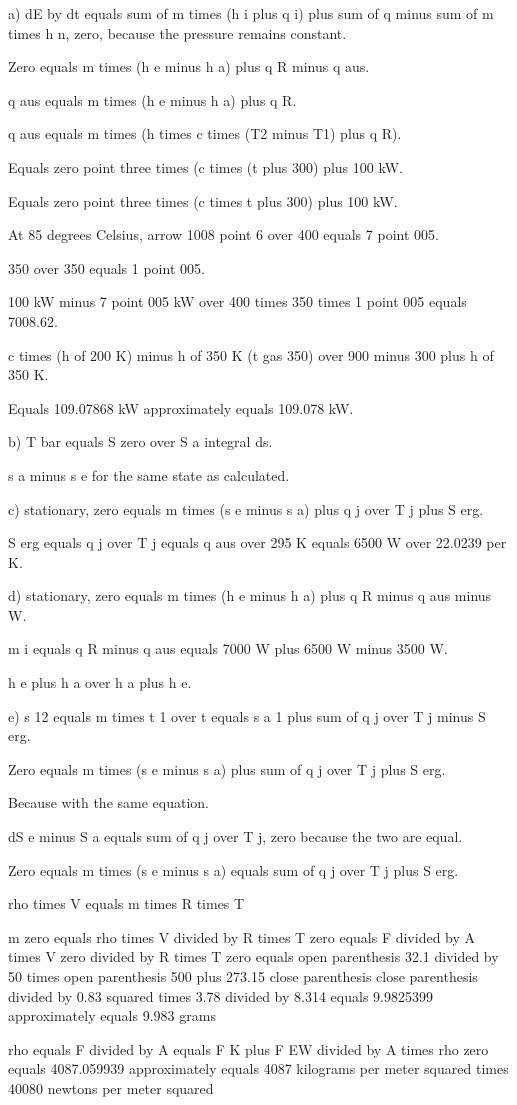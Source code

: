 a) dE by dt equals sum of m times (h i plus q i) plus sum of q minus sum of m times h n, zero, because the pressure remains constant.

Zero equals m times (h e minus h a) plus q R minus q aus.

q aus equals m times (h e minus h a) plus q R.

q aus equals m times (h times c times (T2 minus T1) plus q R).

Equals zero point three times (c times (t plus 300) plus 100 kW.

Equals zero point three times (c times t plus 300) plus 100 kW.

At 85 degrees Celsius, arrow 1008 point 6 over 400 equals 7 point 005.

350 over 350 equals 1 point 005.

100 kW minus 7 point 005 kW over 400 times 350 times 1 point 005 equals 7008.62.

c times (h of 200 K) minus h of 350 K (t gas 350) over 900 minus 300 plus h of 350 K.

Equals 109.07868 kW approximately equals 109.078 kW.

b) T bar equals S zero over S a integral ds.

s a minus s e for the same state as calculated.

c) stationary, zero equals m times (s e minus s a) plus q j over T j plus S erg.

S erg equals q j over T j equals q aus over 295 K equals 6500 W over 22.0239 per K.

d) stationary, zero equals m times (h e minus h a) plus q R minus q aus minus W.

m i equals q R minus q aus equals 7000 W plus 6500 W minus 3500 W.

h e plus h a over h a plus h e.

e) s 12 equals m times t 1 over t equals s a 1 plus sum of q j over T j minus S erg.

Zero equals m times (s e minus s a) plus sum of q j over T j plus S erg.

Because with the same equation.

dS e minus S a equals sum of q j over T j, zero because the two are equal.

Zero equals m times (s e minus s a) equals sum of q j over T j plus S erg.

rho times V equals m times R times T

m zero equals rho times V divided by R times T zero equals F divided by A times V zero divided by R times T zero equals open parenthesis 32.1 divided by 50 times open parenthesis 500 plus 273.15 close parenthesis close parenthesis divided by 0.83 squared times 3.78 divided by 8.314 equals 9.9825399 approximately equals 9.983 grams

rho equals F divided by A equals F K plus F EW divided by A times rho zero equals 4087.059939 approximately equals 4087 kilograms per meter squared times 40080 newtons per meter squared